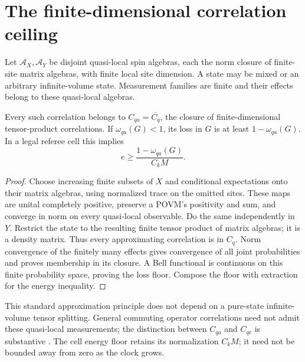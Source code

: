 \section{The finite-dimensional correlation ceiling}\label{sec:qa}
Let $\mathcal A_X,\mathcal A_Y$ be disjoint quasi-local spin
algebras, each the norm closure of finite-site matrix algebras, with
finite local site dimension. A state may be mixed or an arbitrary
infinite-volume state. Measurement families are finite and their
effects belong to these quasi-local algebras.

\begin{proposition}\label{prop:qa}
Every such correlation belongs to $C_{qa}=\overline{C_q}$, the
closure of finite-dimensional tensor-product correlations. If
$\omega_{qa}(G)<1$, its loss in $G$ is at least
$1-\omega_{qa}(G)$. In a legal referee cell this implies
\[
 e\geq\frac{1-\omega_{qa}(G)}{C_kM}.
\]
\end{proposition}
\begin{proof}
Choose increasing finite subsets of $X$ and conditional expectations
onto their matrix algebras, using normalized trace on the omitted
sites. These maps are unital completely positive, preserve a POVM's
positivity and sum, and converge in norm on every quasi-local
observable. Do the same independently in $Y$. Restrict the state to
the resulting finite tensor product of matrix algebras; it is a
density matrix. Thus every approximating correlation is in $C_q$.
Norm convergence of the finitely many effects gives convergence of
all joint probabilities and proves membership in its closure. A Bell
functional is continuous on this finite probability space, proving
the loss floor. Compose the floor with extraction for the energy
inequality.
\end{proof}

This standard approximation principle \cite{scholz} does not depend
on a pure-state infinite-volume tensor splitting. General commuting
operator correlations need not admit these quasi-local measurements;
the distinction between $C_{qa}$ and $C_{qc}$ is substantive
\cite{mip}. The cell energy floor retains its normalization $C_kM$;
it need not be bounded away from zero as the clock grows.
